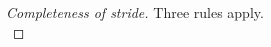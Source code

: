 \begin{proof}[Completeness of stride]
  {
  Three rules apply.\\
   {
  }
   {
   }
   {
   }
  }


\end{proof}
